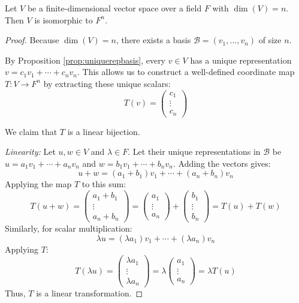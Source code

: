 \documentclass[../linear_algebra_and_groups.tex]{subfiles}
\begin{document}
\begin{theorem}
\label{thm:coordiso}
    \begin{shaded*}
        Let $V$ be a finite-dimensional vector space over a field $F$ with $\dim(V) = n$. Then $V$ is isomorphic to $F^n$.
    \end{shaded*}
\end{theorem}
\begin{proof}
    Because $\dim(V) = n$, there exists a basis $\mathcal{B} = (v_1, \dots, v_n)$ of size $n$. 
    
    By Proposition \ref{prop:uniquerepbasis}, every $v \in V$ has a unique representation $v = c_1v_1 + \cdots + c_nv_n$. This allows us to construct a well-defined coordinate map $T : V \to F^n$ by extracting these unique scalars:
    \[ T(v) = \begin{pmatrix} c_1 \\ \vdots \\ c_n \end{pmatrix} \]
    
    We claim that $T$ is a linear bijection.
    
    \textit{Linearity:} Let $u, w \in V$ and $\lambda \in F$. Let their unique representations in $\mathcal{B}$ be $u = a_1v_1 + \cdots + a_nv_n$ and $w = b_1v_1 + \cdots + b_nv_n$. 
    Adding the vectors gives:
    \[ u + w = (a_1 + b_1)v_1 + \cdots + (a_n + b_n)v_n \]
    Applying the map $T$ to this sum:
    \[ T(u+w) = \begin{pmatrix} a_1 + b_1 \\ \vdots \\ a_n + b_n \end{pmatrix} = \begin{pmatrix} a_1 \\ \vdots \\ a_n \end{pmatrix} + \begin{pmatrix} b_1 \\ \vdots \\ b_n \end{pmatrix} = T(u) + T(w) \]
    Similarly, for scalar multiplication:
    \[ \lambda u = (\lambda a_1)v_1 + \cdots + (\lambda a_n)v_n \]
    Applying $T$:
    \[ T(\lambda u) = \begin{pmatrix} \lambda a_1 \\ \vdots \\ \lambda a_n \end{pmatrix} = \lambda \begin{pmatrix} a_1 \\ \vdots \\ a_n \end{pmatrix} = \lambda T(u) \]
    Thus, $T$ is a linear transformation.
    

\end{proof}
\end{document}
